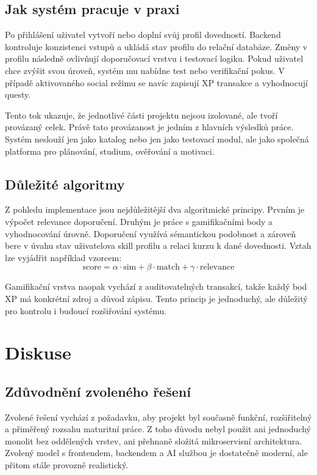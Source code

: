 \documentclass[12pt,a4paper]{report}
\begin{document}
\section{Jak systém pracuje v praxi}
Po přihlášení uživatel vytvoří nebo doplní svůj profil dovedností. Backend kontroluje konzistenci vstupů a ukládá stav profilu do relační databáze. Změny v profilu následně ovlivňují doporučovací vrstvu i testovací logiku. Pokud uživatel chce zvýšit svou úroveň, systém mu nabídne test nebo verifikační pokus. V případě aktivovaného social režimu se navíc zapisují XP transakce a vyhodnocují questy.

Tento tok ukazuje, že jednotlivé části projektu nejsou izolované, ale tvoří provázaný celek. Právě tato provázanost je jedním z hlavních výsledků práce. Systém neslouží jen jako katalog nebo jen jako testovací modul, ale jako společná platforma pro plánování, studium, ověřování a motivaci.

\section{Důležité algoritmy}
Z pohledu implementace jsou nejdůležitější dva algoritmické principy. Prvním je výpočet relevance doporučení. Druhým je práce s gamifikačními body a vyhodnocování úrovně. Doporučení využívá sémantickou podobnost a zároveň bere v úvahu stav uživatelova skill profilu a relaci kurzu k dané dovednosti. Vztah lze vyjádřit například vzorcem:
\[
\mathrm{score}=\alpha \cdot \mathrm{sim}+\beta \cdot \mathrm{match}+\gamma \cdot \mathrm{relevance}
\]

Gamifikační vrstva naopak vychází z auditovatelných transakcí, takže každý bod XP má konkrétní zdroj a důvod zápisu. Tento princip je jednoduchý, ale důležitý pro kontrolu i budoucí rozšiřování systému.

\chapter{Diskuse}
\section{Zdůvodnění zvoleného řešení}
Zvolené řešení vychází z požadavku, aby projekt byl současně funkční, rozšiřitelný a přiměřený rozsahu maturitní práce. Z toho důvodu nebyl použit ani jednoduchý monolit bez oddělených vrstev, ani přehnaně složitá mikroservisní architektura. Zvolený model s frontendem, backendem a AI službou je dostatečně moderní, ale přitom stále provozně realistický.
\end{document}
